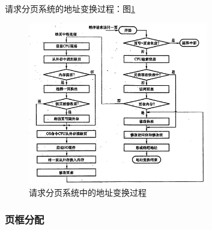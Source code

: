 \documentclass[12pt, a4paper, oneside]{ctexart}
\begin{document}
请求分页系统的地址变换过程：图\ref{page_request_address_translation}

\begin{figure}
  \centering
  \includegraphics[width=0.7\textwidth]{./images/page_request_address_translation.png}
  \caption{请求分页系统中的地址变换过程}
  \label{page_request_address_translation}
\end{figure}

\subsubsection{页框分配}
\end{document}
